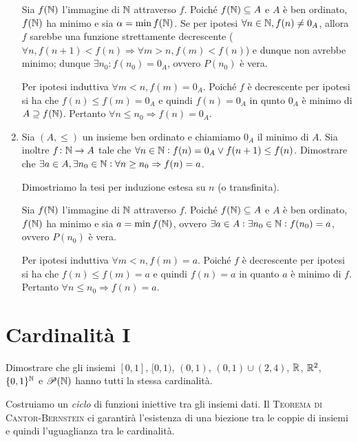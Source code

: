 \documentclass[a4paper]{article}\par \usepackage{style}\par
\begin{document}
\begin{enumerate}
  \begin{pbase}
    Sia $ f(\mathbb{N}) $ l'immagine di $ \mathbb{N} $ attraverso $ f $. Poiché $ f(\mathbb{N}) \subseteq A $ e $ A $ è ben ordinato, $ f(\mathbb{N}) $ ha minimo e sia $ \alpha = \min f(\mathbb{N}) $. Se per ipotesi $ \forall n \in \mathbb{N}, f(n) \neq 0_A $, allora $ f $ sarebbe una funzione strettamente decrescente ($ \forall n, f(n + 1) < f(n) \Rightarrow \forall m > n, f(m) < f(n) $) e dunque non avrebbe minimo; dunque $ \exists n_0 : f(n_0) = 0_A $, ovvero $ P(n_0) $ è vera.
  \end{pbase}
  \begin{pind}
    Per ipotesi induttiva $ \forall m < n, f(m) = 0_A $. Poiché $ f $ è decrescente per ipotesi si ha che $ f(n) \leq f(m) = 0_A $ e quindi $ f(n) = 0_A $ in qunto $ 0_A $ è minimo di $ A \supseteq f(\mathbb{N}) $. Pertanto $ \forall n \leq n_0 \Rightarrow f(n) = 0_A $.
  \end{pind}
\item Sia $ (A, \leq) $ un insieme ben ordinato e chiamiamo $ 0_A $ il minimo di $ A $. Sia inoltre $ f \colon \mathbb{N} \to A $ tale che $ \forall n \in \mathbb{N} : f(n) = 0_A \vee f(n + 1) \leq f(n) $. Dimostrare che $ \exists a \in A, \exists n_0 \in \mathbb{N} : \forall n \geq n_0 \Rightarrow f(n) = a $. \\\par   Dimostriamo la tesi per induzione estesa su $ n $ (o transfinita).
  \begin{pbase}
    Sia $ f(\mathbb{N}) $ l'immagine di $ \mathbb{N} $ attraverso $ f $. Poiché $ f(\mathbb{N}) \subseteq A $ e $ A $ è ben ordinato, $ f(\mathbb{N}) $ ha minimo e sia $ a = \min f(\mathbb{N}) $, ovvero $ \exists a \in A : \exists n_0 \in \mathbb{N} : f(n_0) = a $, ovvero $ P(n_0) $ è vera.
  \end{pbase}
  \begin{pind}
    Per ipotesi induttiva $ \forall m < n, f(m) = a $. Poiché $ f $ è decrescente per ipotesi si ha che $ f(n) \leq f(m) = a $ e quindi $ f(n) = a $ in quanto $ a $ è minimo di $ f $. Pertanto $ \forall n \leq n_0 \Rightarrow f(n) = a $.
  \end{pind}
\end{enumerate}\par \section{Cardinalità I}
\begin{es}
  Dimostrare che gli insiemi $ [0, 1] $, $ [0, 1) $, $ (0, 1) $, $ (0, 1) \cup (2, 4) $, $ \mathbb{R} $, $ \mathbb{R}^2 $, $ \{0, 1\}^{\mathbb{N}} $ e $ \mathscr{P}(\mathbb{N}) $ hanno tutti la stessa cardinalità.
\end{es}\par Costruiamo un \emph{ciclo} di funzioni iniettive tra gli insiemi dati. Il \textsc{Teorema di Cantor-Bernstein} ci garantirà l'esistenza di una biezione tra le coppie di insiemi e quindi l'uguaglianza tra le cardinalità.
\end{document}
